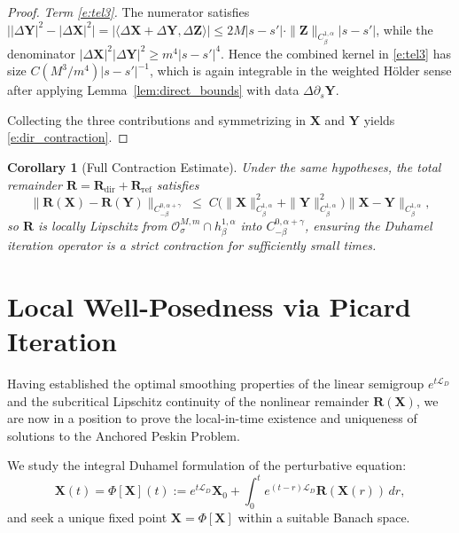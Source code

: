 \documentclass{amsart}
\newtheorem{corollary}[theorem]{Corollary}
\begin{document}
\begin{proof}
\noindent\textit{Term \eqref{e:tel3}.}
The numerator satisfies
$\bigl||\Delta\mathbf{Y}|^2 - |\Delta\mathbf{X}|^2\bigr|
= |\langle \Delta\mathbf{X}+\Delta\mathbf{Y}, \Delta\mathbf{Z}\rangle|
\leq 2M|s-s'|\cdot\|\mathbf{Z}\|_{C^{1,\alpha}_\beta}|s-s'|$,
while the denominator $|\Delta\mathbf{X}|^2|\Delta\mathbf{Y}|^2 \geq m^4|s-s'|^4$.
Hence the combined kernel in \eqref{e:tel3} has size $C(M^3/m^4)|s-s'|^{-1}$,
which is again integrable in the weighted Hölder sense after applying
Lemma~\ref{lem:direct_bounds} with data $\Delta\partial_s\mathbf{Y}$.

\medskip
Collecting the three contributions and symmetrizing in $\mathbf{X}$ and $\mathbf{Y}$
yields \eqref{e:dir_contraction}.
\end{proof}


\begin{corollary}[Full Contraction Estimate]\label{cor:full_contraction}
Under the same hypotheses, the total remainder $\mathbf{R} = \mathbf{R}_{\mathrm{dir}} + \mathbf{R}_{\mathrm{ref}}$ satisfies
\begin{equation}
  \|\mathbf{R}(\mathbf{X}) - \mathbf{R}(\mathbf{Y})\|_{C^{0,\alpha+\gamma}_{-\beta}}
  \;\leq\;
  C\bigl(\|\mathbf{X}\|_{C^{1,\alpha}_\beta}^2 + \|\mathbf{Y}\|_{C^{1,\alpha}_\beta}^2\bigr)
  \|\mathbf{X} - \mathbf{Y}\|_{C^{1,\alpha}_\beta},
\end{equation}
so $\mathbf{R}$ is locally Lipschitz from $\mathcal{O}^{M,m}_\sigma \cap h^{1,\alpha}_\beta$
into $C^{0,\alpha+\gamma}_{-\beta}$, ensuring the Duhamel iteration operator is a
strict contraction for sufficiently small times.
\end{corollary}

\section{Local Well-Posedness via Picard Iteration}
\label{s:well_posedness}

Having established the optimal smoothing properties of the linear semigroup $e^{t\mathcal{L}_D}$ and the subcritical Lipschitz continuity of the nonlinear remainder $\mathbf{R}(\mathbf{X})$, we are now in a position to prove the local-in-time existence and uniqueness of solutions to the Anchored Peskin Problem.

We study the integral Duhamel formulation of the perturbative equation:
\begin{equation}\label{eq:Duhamel_operator}
\mathbf{X}(t) = \Phi[\mathbf{X}](t) := e^{t\mathcal{L}_D}\mathbf{X}_0 + \int_0^t e^{(t-r)\mathcal{L}_D} \mathbf{R}(\mathbf{X}(r)) \, dr,
\end{equation}
and seek a unique fixed point $\mathbf{X} = \Phi[\mathbf{X}]$ within a suitable Banach space.
\end{document}
